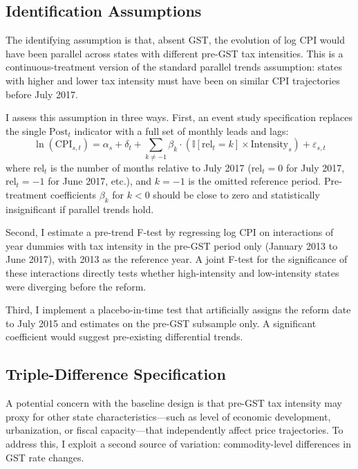 \documentclass[12pt]{article}
\newcommand{\ind}{\mathbb{I}}
\begin{document}
\subsection{Identification Assumptions}

The identifying assumption is that, absent GST, the evolution of log CPI would have been parallel across states with different pre-GST tax intensities. This is a continuous-treatment version of the standard parallel trends assumption: states with higher and lower tax intensity must have been on similar CPI trajectories before July 2017.

I assess this assumption in three ways. First, an event study specification replaces the single $\text{Post}_t$ indicator with a full set of monthly leads and lags:
\begin{equation}\label{eq:eventstudy}
\ln(\text{CPI}_{s,t}) = \alpha_s + \delta_t + \sum_{k \neq -1} \beta_k \cdot (\ind[\text{rel}_t = k] \times \text{Intensity}_s) + \varepsilon_{s,t}
\end{equation}
where $\text{rel}_t$ is the number of months relative to July 2017 ($\text{rel}_t = 0$ for July 2017, $\text{rel}_t = -1$ for June 2017, etc.), and $k = -1$ is the omitted reference period. Pre-treatment coefficients $\beta_k$ for $k < 0$ should be close to zero and statistically insignificant if parallel trends hold.

Second, I estimate a pre-trend F-test by regressing log CPI on interactions of year dummies with tax intensity in the pre-GST period only (January 2013 to June 2017), with 2013 as the reference year. A joint F-test for the significance of these interactions directly tests whether high-intensity and low-intensity states were diverging before the reform.

Third, I implement a placebo-in-time test that artificially assigns the reform date to July 2015 and estimates  on the pre-GST subsample only. A significant coefficient would suggest pre-existing differential trends.

\subsection{Triple-Difference Specification}

A potential concern with the baseline design is that pre-GST tax intensity may proxy for other state characteristics---such as level of economic development, urbanization, or fiscal capacity---that independently affect price trajectories. To address this, I exploit a second source of variation: commodity-level differences in GST rate changes.
\end{document}
